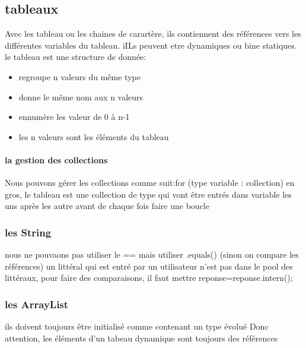 \documentclass[a4paper,10pt]{article}
\begin{document}
\subsection{tableaux}
Avec les tableau ou les chaines de carartère, ils contiennent des références vers les différentes variables du tableau. iILs peuvent etre dynamiques ou bine statiques.
\newline
le tableau est une structure de donnée:
\begin{itemize}
 \item regroupe n valeurs du même type
 \item donne le même nom aux n valeurs
 \item ennumère les valeur de 0 à n-1
 \item les n valeurs sont les éléments du tableau
\end{itemize}
\paragraph{la gestion des collections}
Nous pouvons gérer les collections comme suit:for (type variable : collection)
\newline
en gros, le tableau est une collection de type qui vont être entrés dans variable les uns après les autre avant de chaque fois faire une boucle
\subsubsection{les String}
nous ne pouvaons pas utiliser le == mais utiliser .equals() (sinon on compare les références)
\newline
un littéral qui est entré par un utilisateur n'est pas dans le pool des littéraux, pour faire des comparaisons, il faut mettre reponse=reponse.intern();
\subsubsection{les ArrayList}
ils doivent toujours être initialisé comme contenant un type évolué
\newline
Donc attention, les éléments d'un tabeau dynamique sont toujours des références
\end{document}
